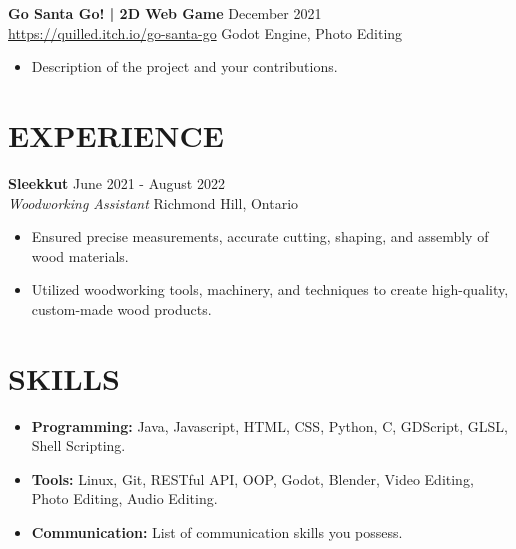 \documentclass[a4paper,9pt]{extarticle}
\begin{document}
\noindent
\textbf{Go Santa Go! | 2D Web Game} \hfill December 2021\\
\url{https://quilled.itch.io/go-santa-go} \hfill Godot Engine, Photo Editing
\begin{itemize}
	\item Description of the project and your contributions.
\end{itemize}

\section*{EXPERIENCE}
\noindent
\textbf{Sleekkut} \hfill June 2021 - August 2022\\
\textit{Woodworking Assistant} \hfill Richmond Hill, Ontario
\begin{itemize}
	\item Ensured precise measurements, accurate cutting, shaping, and assembly of wood materials.
	\item Utilized woodworking tools, machinery, and techniques to create high-quality, custom-made wood products.
\end{itemize}


\section*{SKILLS}
\begin{itemize}
	\item \textbf{Programming:} Java, Javascript, HTML, CSS, Python, C, GDScript, GLSL, Shell Scripting.
	\item \textbf{Tools:} Linux, Git, RESTful API, OOP, Godot, Blender, Video Editing, Photo Editing, Audio Editing.
	\item \textbf{Communication:} List of communication skills you possess.
\end{itemize}
\end{document}
